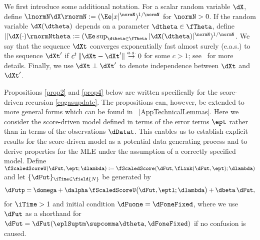 We first introduce some additional notation.
For a scalar random variable $\dX$,
define $\lnormN \dX \rnormN := (\Ee|x|^\normN)^{1/\normN}$ for $\normN > 0$.
If the random variable $\dX(\dtheta)$ depends on a parameter $\dtheta \in \fTheta$,  define 
$\| \dX(\cdot) \rnormNtheta := ( \Ee \sup_{\dtheta \in \fTheta} |\dX(\dtheta)|^{\normN} )^{1/\normN}$.
We say that the sequence $\dXt$ converges exponentially fast almost surely (e.a.s.) to the sequence $\dXt'$ if $c^t\,\|\dXt - \dXt'\| \stackrel{a.s.}{\to} 0$ for some $c>1$; see \cite{smikosch2006}\ for more details.
Finally, we use $\dXt \perp \dXt'$ to denote independence between $\dXt$ and $\dXt'$.


Propositions \ref{prop2} and \ref{prop4} below are written specifically for the score-driven recursion \eqref{eqgasupdate}. 
The propositions can, however, be extended to more general forms which can be found in \SupplementaryAppendix~\ref{AppTechnicalLemmas}. 
Here we consider the score-driven model defined in terms of the error terms $\ept$ rather than in terms of the observations $\dDatat$.
This enables us to establish explicit results for the score-driven model as a potential data generating process and  to derive properties for the MLE under the assumption of a correctly specified model.
Define 
$\fScaledScoreU(\dFut,\ept;\dlambda) := \fScaledScore (\dFut,\fLink(\dFut,\ept);\dlambda)$ and let  
$\{ \dFut \}_{\iTime \in \field{N}}$ be generated by
\begin{equation} \label{NRpg10}
    \dFutp = 
    \domega + 
    \dalpha\, \fScaledScoreU \big(\dFut,\eptl ; \dlambda  \big) + 
    \dbeta\, \dFut ,
\end{equation}
for $\iTime>1$ and initial condition $\dFuone = \dFoneFixed$, where we use $\dFut$ as a shorthand for $\dFut = \dFut(\eplSuptm\supcomma\dtheta,\dFoneFixed)$ if no confusion is caused.

